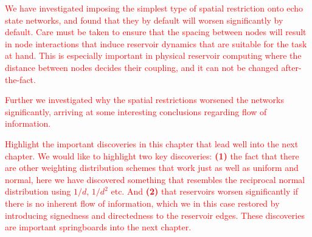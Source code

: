 \textcolor{red}{
  We have investigated imposing the simplest type of spatial restriction onto
echo state networks, and found that they by default will worsen significantly by
default. Care must be taken to ensure that the spacing between nodes will result
in node interactions that induce reservoir dynamics that are suitable for the
task at hand. This is especially important in physical reservoir computing where
the distance between nodes decides their coupling, and it can not be changed
after-the-fact.
}

\textcolor{red}{
  Further we investigated why the spatial restrictions worsened the networks
significantly, arriving at some interesting conclusions regarding flow of
information.
}

\textcolor{red}{
  Highlight the important discoveries in this chapter that lead well into the
next chapter. We would like to highlight two key discoveries: \textbf{(1)} the
fact that there are other weighting distribution schemes that work just as well
as uniform and normal, here we have discovered something that resembles the
reciprocal normal distribution using $1/d$, $1/d^2$ etc. And \textbf{(2)} that
reservoirs worsen significantly if there is no inherent flow of information,
which we in this case restored by introducing signedness and directedness to the
reservoir edges. These discoveries are important springboards into the next
chapter.
}


